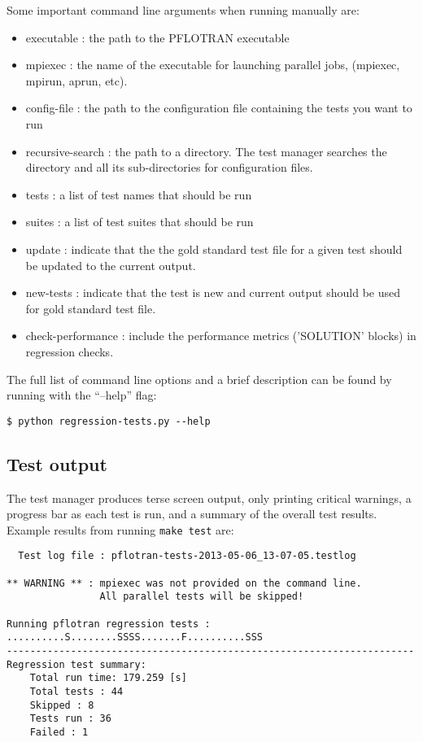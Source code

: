 Some important command line arguments when running manually are:
\begin{itemize}
\item executable : the path to the PFLOTRAN executable
\item mpiexec : the name of the executable for launching parallel
  jobs, (mpiexec, mpirun, aprun, etc).
\item config-file : the path to the configuration file containing the
  tests you want to run
\item recursive-search : the path to a directory. The test manager
  searches the directory and all its sub-directories for configuration
  files.
\item tests : a list of test names that should be run
\item suites : a list of test suites that should be run
\item update : indicate that the the gold standard test file for a
  given test should be updated to the current output.
\item new-tests : indicate that the test is new and current output
  should be used for gold standard test file.
\item check-performance : include the performance metrics ('SOLUTION'
  blocks) in regression checks.
\end{itemize}

The full list of command line options and a brief description can be
found by running with the ``--help'' flag:
\begin{verbatim}
$ python regression-tests.py --help
\end{verbatim}

\subsection{Test output}
The test manager produces terse screen output, only printing critical
warnings, a progress bar as each test is run, and a summary of the
overall test results. Example results from running \texttt{make test} are:

\begin{mdframed}
\begin{verbatim}
  Test log file : pflotran-tests-2013-05-06_13-07-05.testlog

** WARNING ** : mpiexec was not provided on the command line.
                All parallel tests will be skipped!

Running pflotran regression tests :
..........S........SSSS.......F..........SSS
----------------------------------------------------------------------
Regression test summary:
    Total run time: 179.259 [s]
    Total tests : 44
    Skipped : 8
    Tests run : 36
    Failed : 1
\end{verbatim}
\end{mdframed}

